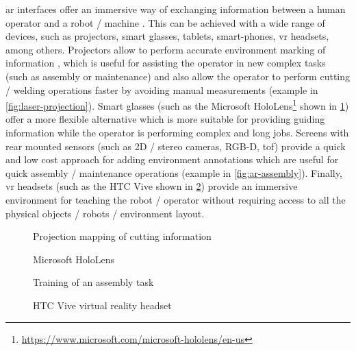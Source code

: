 \gls{ar} interfaces \cite{Bimber2005} offer an immersive way of exchanging information between a human operator and a robot / machine \cite{Kollatsch2014,Gaschler2014,Dini2015,Michalos2016}. This can be achieved with a wide range of devices, such as projectors, smart glasses, tablets, smart-phones, \gls{vr} headsets, among others. Projectors allow to perform accurate environment marking of information \cite{Tan2013,Fujimoto2014}, which is useful for assisting the operator in new complex tasks (such as assembly or maintenance) and also allow the operator to perform cutting / welding operations faster by avoiding manual measurements (example in \cref{fig:laser-projection}). Smart glasses (such as the Microsoft HoloLens\footnote{\url{https://www.microsoft.com/microsoft-hololens/en-us}} shown in \cref{fig:hololens}) offer a more flexible alternative which is more suitable for providing guiding information while the operator is performing complex and long jobs. Screens with rear mounted sensors (such as 2D / stereo cameras, RGB-D, \gls{tof}) provide a quick and low cost approach for adding environment annotations which are useful for quick assembly / maintenance operations (example in \cref{fig:ar-assembly}). Finally, \gls{vr} headsets (such as the HTC Vive shown in \cref{fig:htc-vive}) provide an immersive environment for teaching the robot / operator without requiring access to all the physical objects / robots / environment layout.

\begin{figure}[H]
	\begin{floatrow}[2]
		{\caption[Projection mapping of cutting information]{Projection mapping of cutting information\protect\footnotemark}\label{fig:laser-projection}}
		{\caption[Microsoft HoloLens]{Microsoft HoloLens\protect\footnotemark}\label{fig:hololens}}
	\end{floatrow}
\end{figure}

\begin{figure}[H]
	\begin{floatrow}[2]
		{\caption[Training of a assembly task]{Training of an assembly task \cite{Webel2013}}\label{fig:ar-assembly}}
		{\caption[HTC Vive virtual reality headset]{HTC Vive virtual reality headset\protect\footnotemark}\label{fig:htc-vive}}
	\end{floatrow}
\end{figure}


